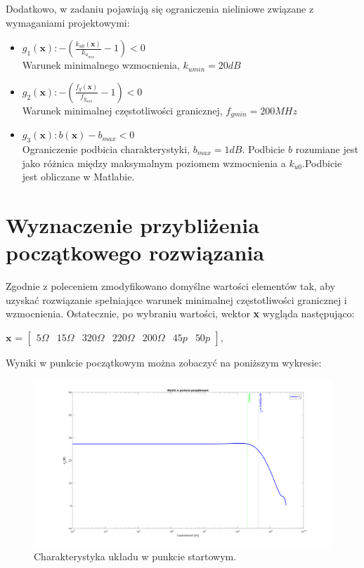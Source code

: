 \documentclass{article}
\begin{document}
Dodatkowo, w zadaniu pojawiają się ograniczenia nieliniowe związane z wymaganiami projektowymi:\\
\begin{itemize}
	\item \(g_1(\textbf{x}): -(\frac{k_{u0}(\textbf{x})}{k_{u_{min}}}-1) <  0\) \\ Warunek minimalnego wzmocnienia, $k_{umin}=20dB$
	\item \(g_2(\textbf{x}): -(\frac{{f_g}(\textbf{x})}{f_{g_{min}}}-1)<0\) \\ Warunek minimalnej częstotliwości granicznej, $f_{gmin}=200 MHz$
	\item \(g_3(\textbf{x}): b(\textbf{x})-b_{max}<0\) \\ Ograniczenie podbicia charakterystyki, $b_{max}=1dB$. Podbicie $b$ rozumiane jest jako różnica między maksymalnym poziomem wzmocnienia a $k_{u0}$.Podbicie jest obliczane w Matlabie.

\end{itemize}



\section{Wyznaczenie przybliżenia początkowego rozwiązania}
Zgodnie z poleceniem zmodyfikowano domyślne wartości elementów tak, aby uzyskać rozwiązanie spełniające warunek minimalnej częstotliwości granicznej i wzmocnienia.
Ostatecznie, po wybraniu wartości, wektor \textbf{x} wygląda następująco:
\begin{center}
	$\textbf{x}$ =
	$\begin{bmatrix}
			5\Omega & 15\Omega & 320\Omega & 220\Omega & 200\Omega & 45p & 50p
		\end{bmatrix}$,
\end{center}

Wyniki w punkcie początkowym można zobaczyć na poniższym wykresie:

\begin{figure}[h]
	\includegraphics[width=12cm]{graphics/starting_point.png}
	\centering
	\caption{Charakterystyka układu w punkcie startowym.}
\end{figure}
\end{document}
